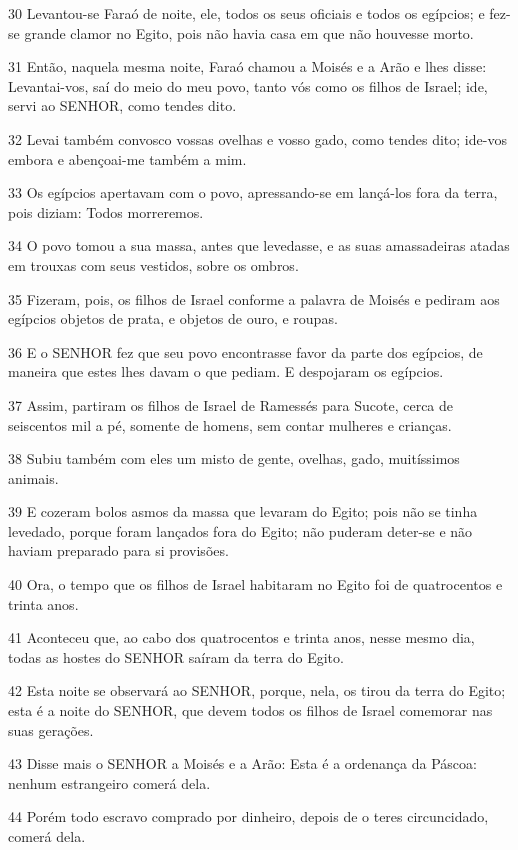 \par 30 Levantou-se Faraó de noite, ele, todos os seus oficiais e todos os egípcios; e fez-se grande clamor no Egito, pois não havia casa em que não houvesse morto.
\par 31 Então, naquela mesma noite, Faraó chamou a Moisés e a Arão e lhes disse: Levantai-vos, saí do meio do meu povo, tanto vós como os filhos de Israel; ide, servi ao SENHOR, como tendes dito.
\par 32 Levai também convosco vossas ovelhas e vosso gado, como tendes dito; ide-vos embora e abençoai-me também a mim.
\par 33 Os egípcios apertavam com o povo, apressando-se em lançá-los fora da terra, pois diziam: Todos morreremos.
\par 34 O povo tomou a sua massa, antes que levedasse, e as suas amassadeiras atadas em trouxas com seus vestidos, sobre os ombros.
\par 35 Fizeram, pois, os filhos de Israel conforme a palavra de Moisés e pediram aos egípcios objetos de prata, e objetos de ouro, e roupas.
\par 36 E o SENHOR fez que seu povo encontrasse favor da parte dos egípcios, de maneira que estes lhes davam o que pediam. E despojaram os egípcios.
\par 37 Assim, partiram os filhos de Israel de Ramessés para Sucote, cerca de seiscentos mil a pé, somente de homens, sem contar mulheres e crianças.
\par 38 Subiu também com eles um misto de gente, ovelhas, gado, muitíssimos animais.
\par 39 E cozeram bolos asmos da massa que levaram do Egito; pois não se tinha levedado, porque foram lançados fora do Egito; não puderam deter-se e não haviam preparado para si provisões.
\par 40 Ora, o tempo que os filhos de Israel habitaram no Egito foi de quatrocentos e trinta anos.
\par 41 Aconteceu que, ao cabo dos quatrocentos e trinta anos, nesse mesmo dia, todas as hostes do SENHOR saíram da terra do Egito.
\par 42 Esta noite se observará ao SENHOR, porque, nela, os tirou da terra do Egito; esta é a noite do SENHOR, que devem todos os filhos de Israel comemorar nas suas gerações.
\par 43 Disse mais o SENHOR a Moisés e a Arão: Esta é a ordenança da Páscoa: nenhum estrangeiro comerá dela.
\par 44 Porém todo escravo comprado por dinheiro, depois de o teres circuncidado, comerá dela.
